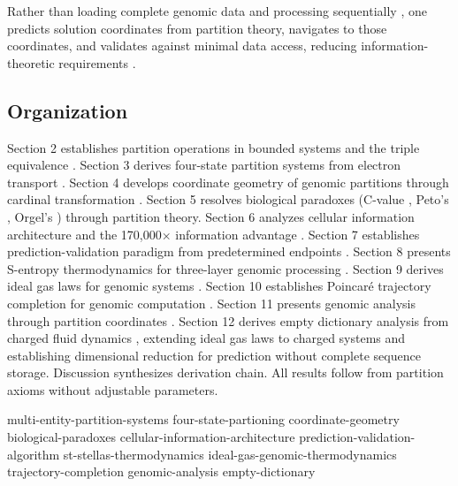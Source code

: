 \documentclass[11pt,a4paper]{article}
\theoremstyle{remark}
\begin{document}
Rather than loading complete genomic data and processing sequentially \citep{altschul1990basic, gusfield1997algorithms}, one predicts solution coordinates from partition theory, navigates to those coordinates, and validates against minimal data access, reducing information-theoretic requirements \citep{shannon1948mathematical, landauer1961irreversibility}.

\subsection{Organization}

Section 2 establishes partition operations in bounded systems and the triple equivalence \citep{poincare1890probleme, birkhoff1931proof}. Section 3 derives four-state partition systems from electron transport \citep{mitchell1961coupling, nicholls2013bioenergetics}. Section 4 develops coordinate geometry of genomic partitions through cardinal transformation \citep{nandy2006graphical, yau2003dna}. Section 5 resolves biological paradoxes (C-value \citep{gregory2001coincidence}, Peto's \citep{peto1977naturally}, Orgel's \citep{orgel1968evolution}) through partition theory. Section 6 analyzes cellular information architecture and the 170,000$\times$ information advantage \citep{shannon1948mathematical, elowitz2002stochastic}. Section 7 establishes prediction-validation paradigm from predetermined endpoints \citep{landauer1961irreversibility}. Section 8 presents S-entropy thermodynamics for three-layer genomic processing \citep{callen1985thermodynamics}. Section 9 derives ideal gas laws for genomic systems \citep{reif1965fundamentals}. Section 10 establishes Poincaré trajectory completion for genomic computation \citep{poincare1890probleme}. Section 11 presents genomic analysis through partition coordinates \citep{altschul1990basic, gusfield1997algorithms}. Section 12 derives empty dictionary analysis from charged fluid dynamics \citep{chen2016introduction, debye1923theory}, extending ideal gas laws to charged systems and establishing dimensional reduction for prediction without complete sequence storage. Discussion synthesizes derivation chain. All results follow from partition axioms without adjustable parameters.

{multi-entity-partition-systems}
{four-state-partioning}
{coordinate-geometry}
{biological-paradoxes}
{cellular-information-architecture}
{prediction-validation-algorithm}
{st-stellas-thermodynamics}
{ideal-gas-genomic-thermodynamics}
{trajectory-completion}
{genomic-analysis}
{empty-dictionary}
\end{document}

